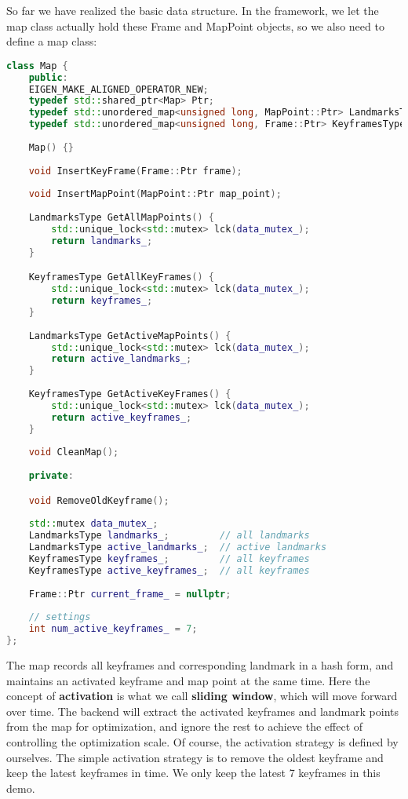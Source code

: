 So far we have realized the basic data structure. In the framework, we let the map class actually hold these Frame and MapPoint objects, so we also need to define a map class:

\begin{lstlisting}[language=c++,caption=slambook2/ch13/include/myslam/map.h]
class Map {
	public:
	EIGEN_MAKE_ALIGNED_OPERATOR_NEW;
	typedef std::shared_ptr<Map> Ptr;
	typedef std::unordered_map<unsigned long, MapPoint::Ptr> LandmarksType;
	typedef std::unordered_map<unsigned long, Frame::Ptr> KeyframesType;
	
	Map() {}
	
	void InsertKeyFrame(Frame::Ptr frame);
	
	void InsertMapPoint(MapPoint::Ptr map_point);
	
	LandmarksType GetAllMapPoints() {
		std::unique_lock<std::mutex> lck(data_mutex_);
		return landmarks_;
	}

	KeyframesType GetAllKeyFrames() {
		std::unique_lock<std::mutex> lck(data_mutex_);
		return keyframes_;
	}
	
	LandmarksType GetActiveMapPoints() {
		std::unique_lock<std::mutex> lck(data_mutex_);
		return active_landmarks_;
	}
	
	KeyframesType GetActiveKeyFrames() {
		std::unique_lock<std::mutex> lck(data_mutex_);
		return active_keyframes_;
	}
	
	void CleanMap();
	
	private:

	void RemoveOldKeyframe();
	
	std::mutex data_mutex_;
	LandmarksType landmarks_;         // all landmarks
	LandmarksType active_landmarks_;  // active landmarks
	KeyframesType keyframes_;         // all keyframes
	KeyframesType active_keyframes_;  // all keyframes
	
	Frame::Ptr current_frame_ = nullptr;
	
	// settings
	int num_active_keyframes_ = 7;  
};
\end{lstlisting}

The map records all keyframes and corresponding landmark in a hash form, and maintains an activated keyframe and map point at the same time. Here the concept of \textbf{activation} is what we call \textbf{sliding window}, which will move forward over time. The backend will extract the activated keyframes and landmark points from the map for optimization, and ignore the rest to achieve the effect of controlling the optimization scale. Of course, the activation strategy is defined by ourselves. The simple activation strategy is to remove the oldest keyframe and keep the latest keyframes in time. We only keep the latest 7 keyframes in this demo.

